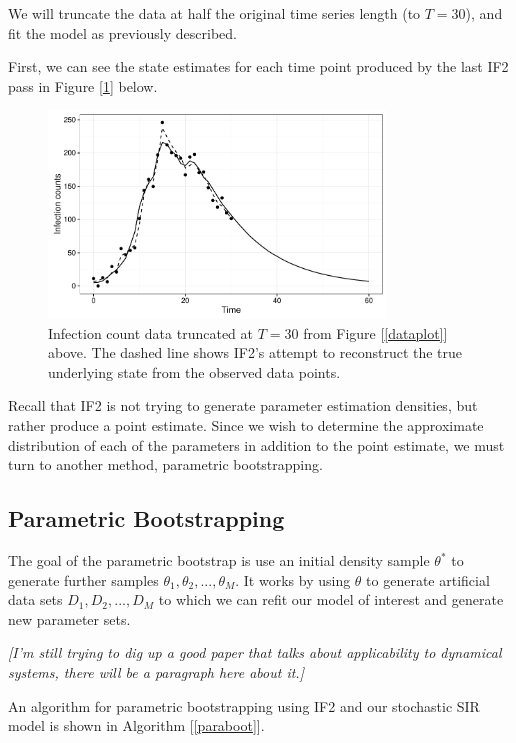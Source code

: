 	We will truncate the data at half the original time series length (to $T = 30$), and fit the model as previously described.

	First, we can see the state estimates for each time point produced by the last IF2 pass in Figure [\ref{if2fit}] below.

	\begin{figure}[H]
        \centering
        \captionsetup{width=.8\linewidth}
        \includegraphics[width=0.8\textwidth]{./images/if2fit.pdf}
        \caption{Infection count data truncated at $T = 30$ from Figure [\ref{dataplot}] above. The dashed line shows IF2's attempt to reconstruct the true underlying state from the observed data points.}
        \label{if2fit}
    \end{figure}

    Recall that IF2 is not trying to generate parameter estimation densities, but rather produce a point estimate. Since we wish to determine the approximate distribution of each of the parameters in addition to the point estimate, we must turn to another method, parametric bootstrapping.


\subsection{Parametric Bootstrapping}

	The goal of the parametric bootstrap is use an initial density sample $\theta^*$ to generate further samples $\theta_1, \theta_2, ..., \theta_M$. It works by using $\theta$ to generate artificial data sets $D_1, D_2, ..., D_M$ to which we can refit our model of interest and generate new parameter sets.

	\textit{[I'm still trying to dig up a good paper that talks about applicability to dynamical systems, there will be a paragraph here about it.]}

	An algorithm for parametric bootstrapping using IF2 and our stochastic SIR model is shown in Algorithm [\ref{paraboot}].

